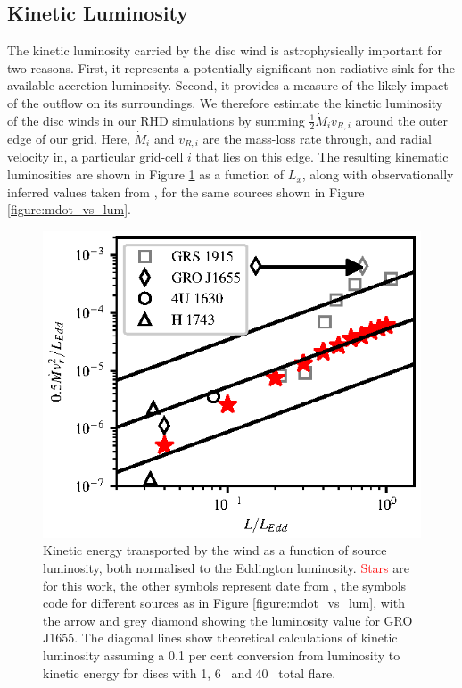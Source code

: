 \documentclass[a4paper,fleqn,usenatbib]{mnras}
\begin{document}
\subsection{Kinetic Luminosity}

The kinetic luminosity carried by the disc wind is astrophysically
important for two reasons. First, it represents a potentially
significant non-radiative sink for the available accretion
luminosity. Second, it provides a measure of the likely impact of the
outflow on its surroundings. We therefore estimate the kinetic
luminosity of the disc winds in our RHD simulations by summing
$\frac{1}{2}\dot{M}_i v_{R,i}$ around the outer edge of our
grid. Here, $\dot{M}_i$ and $v_{R,i}$ are the mass-loss rate through,
and radial velocity in, a particular grid-cell $i$ that lies on this
edge. The resulting kinematic luminosities are shown in Figure
\ref{figure:ke_vs_lum} as a function of $L_x$, along with
observationally inferred values taken from
\citep{2016AN....337..512P}, for the same sources shown in
Figure \ref{figure:mdot_vs_lum}.


\begin{figure}
\includegraphics[width=\columnwidth]{figures/fig7_lum_vs_ke_ponti.eps}
\caption{Kinetic energy transported by the wind  as a function of source luminosity, both
normalised to the Eddington luminosity. \textcolor{red}{Stars} are for this work, the other symbols represent
date from
\protect\cite{2016AN....337..512P}, the symbols code for different sources as in Figure \ref{figure:mdot_vs_lum},
with the arrow and grey diamond showing the \protect\cite{2016ApJ...823..159S} luminosity
value for GRO J1655.
The diagonal lines show theoretical calculations of kinetic luminosity assuming a 0.1 per cent conversion
from luminosity to kinetic energy for discs with 1\degree, 6\degree~ and 40\degree~ total flare.}
\label{figure:ke_vs_lum}
\end{figure}
\end{document}

